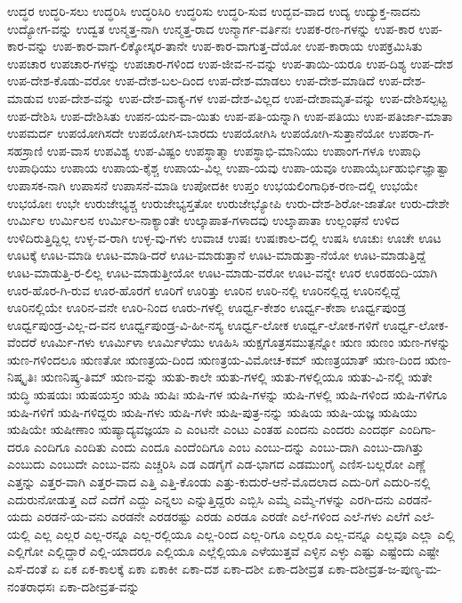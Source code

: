 {ಉದ್ಧರ
ಉದ್ಧರಿ-ಸಲು
ಉದ್ಧರಿಸಿ
ಉದ್ಧರಿಸಿರಿ
ಉದ್ಧರಿಸು
ಉದ್ಧರಿ-ಸುವ
ಉದ್ಭವ-ವಾದ
ಉದ್ಯ
ಉದ್ಯುಕ್ತ-ನಾದನು
ಉದ್ಯೋಗ-ವನ್ನು
ಉದ್ವತ
ಉನ್ಮತ್ತ-ನಾಗಿ
ಉನ್ಮತ್ತ-ರಾದ
ಉನ್ಮಾರ್ಗ-ವರ್ತಿನಃ
ಉಪಕ-ರಣ-ಗಳನ್ನು
ಉಪ-ಕಾರ
ಉಪ-ಕಾರ-ವನ್ನು
ಉಪ-ಕಾರ-ವಾಗ-ಲಿಕ್ಕೋಸ್ಕರ-ತಾನೇ
ಉಪ-ಕಾರ-ವಾಗುತ್ತ-ದೆಯೋ
ಉಪ-ಕಾರಾಯ
ಉಪಕ್ರಮಿಸಿತು
ಉಪಚಾರ
ಉಪಚಾರ-ಗಳನ್ನು
ಉಪಚಾರ-ಗಳಿಂದ
ಉಪ-ಜೀವ-ನ-ವನ್ನು
ಉಪ-ತಾಯಿ-ಯರೂ
ಉಪ-ದಿಶ್ಯ
ಉಪ-ದೇಶ
ಉಪ-ದೇಶ-ಕೊಡು-ವರೋ
ಉಪ-ದೇಶ-ಬಲ-ದಿಂದ
ಉಪ-ದೇಶ-ಮಾಡಲು
ಉಪ-ದೇಶ-ಮಾಡಿದೆ
ಉಪ-ದೇಶ-ಮಾಡುವ
ಉಪ-ದೇಶ-ವನ್ನು
ಉಪ-ದೇಶ-ವಾಕ್ಯ-ಗಳ
ಉಪ-ದೇಶ-ವಿಲ್ಲದ
ಉಪ-ದೇಶಾಮೃತ-ವನ್ನು
ಉಪ-ದೇಶಿಸಲ್ಪಟ್ಟ
ಉಪ-ದೇಶಿಸಿ
ಉಪ-ದೇಶಿಸಿತು
ಉಪನ-ಯನ-ವಾ-ಯಿತು
ಉಪ-ಪತಿ-ಯನ್ನಾಗಿ
ಉಪ-ಪತಿಯು
ಉಪ-ಪತಿರ್ಜಾ-ಮಾತಾ
ಉಪಮರ್ದ
ಉಪಯೋಗಿಸದೇ
ಉಪಯೋಗಿಸ-ಬಾರದು
ಉಪಯೋಗಿಸಿ
ಉಪಯೋಗಿ-ಸುತ್ತಾನೆಯೋ
ಉಪರಾ-ಗ-ಸಹಸ್ರಾಣಿ
ಉಪ-ವಾಸ
ಉಪವಿಶ್ಯ
ಉಪ-ವಿಷ್ಟಂ
ಉಪಸ್ಥಾತ್ಮಾ
ಉಪಸ್ಥಾಭಿ-ಮಾನಿಯು
ಉಪಾಂಗ-ಗಳೂ
ಉಪಾಧಿ
ಉಪಾಧಿಯು
ಉಪಾಯ
ಉಪಾಯ-ಕೈಶ್ಚ
ಉಪಾಯ-ವಿಲ್ಲ
ಉಪಾ-ಯವು
ಉಪಾ-ಯವೂ
ಉಪಾಯೈರ್ಬಹುರ್ಭಿಜ್ಞಾತ್ವಾ
ಉಪಾಸಕ-ನಾಗಿ
ಉಪಾಸನೆ
ಉಪಾಸನೆ-ಮಾಡಿ
ಉಪೋದಕೀ
ಉಪ್ತಂ
ಉಭಯಲಿಂಗಾಧಿಕ-ರಣ-ದಲ್ಲಿ
ಉಭಯೇ
ಉಭಯೋಃ
ಉಭೇ
ಉರುಜೇಭ್ಯಶ್ಚ
ಉರುಜೇಭ್ಯಸ್ತತೋ
ಉರುಜೇಭ್ಯೋಪಿ
ಉರು-ದೇಶ-ಶಿರೋ-ಜಾತೋ
ಉರು-ದೇಶೇ
ಉರ್ಮಿಲ
ಉರ್ಮಿಲನ
ಉರ್ಮಿಲ-ನಾಕ್ಯಾಂತೇ
ಉಲ್ಕಾಪಾತ-ಗಳಾದವು
ಉಲ್ಕಾಪಾತಾ
ಉಲ್ಲಂಘನೆ
ಉಳಿದ
ಉಳಿದಿರುತ್ತಿದ್ದಿಲ್ಲ
ಉಳ್ಳ-ವ-ರಾಗಿ
ಉಳ್ಳ-ವು-ಗಳು
ಉವಾಚ
ಉಷಃ
ಉಷಃಕಾಲ-ದಲ್ಲಿ
ಉಷಸಿ
ಊಚುಃ
ಊಚೇ
ಊಟ
ಊಟಕ್ಕೆ
ಊಟ-ಮಾಡಿ
ಊಟ-ಮಾಡಿ-ದರೆ
ಊಟ-ಮಾಡುತ್ತಾನೆ
ಊಟ-ಮಾಡುತ್ತಾ-ನೆಯೋ
ಊಟ-ಮಾಡುತ್ತಿದ್ದೆ
ಊಟ-ಮಾಡುತ್ತಿ-ರ-ಲಿಲ್ಲ
ಊಟ-ಮಾಡುತ್ತೀಯೋ
ಊಟ-ಮಾಡು-ವರೋ
ಊಟ-ವನ್ನೇ
ಊರ
ಊರಹಂದಿ-ಯಾಗಿ
ಊರ-ಹೊರ-ಗಿ-ರುವ
ಊರ-ಹೊರಗೆ
ಊರಿಗೆ
ಊರಿತ್ತು
ಊರಿನ
ಊರಿ-ನಲ್ಲಿ
ಊರಿನಲ್ಲಿದ್ದ
ಊರಿನಲ್ಲಿದ್ದೆ
ಊರಿನಲ್ಲಿಯೇ
ಊರಿನ-ವನೇ
ಊರಿ-ನಿಂದ
ಊರು-ಗಳಲ್ಲಿ
ಊರ್ಧ್ವ-ಕೇಶಂ
ಊರ್ಧ್ವ-ಕೇಶಾ
ಊರ್ಧ್ವಪುಂಡ್ರ
ಊರ್ಧ್ವಪುಂಡ್ರ-ವಿಲ್ಲ-ದ-ವನ
ಊರ್ಧ್ವಪುಂಡ್ರ-ವಿ-ಹೀ-ನಸ್ಯ
ಊರ್ಧ್ವ-ಲೋಕ
ಊರ್ಧ್ವ-ಲೋಕ-ಗಳಿಗೆ
ಊರ್ಧ್ವ-ಲೋಕ-ವೆಂದರೆ
ಊರ್ಮಿ-ಗಳು
ಊರ್ಮಿಳಾ
ಊರ್ಮಿಳೆಯು
ಊಹಿಸಿ
ಋಕ್ಷಗೊತ್ರಸಮುತ್ಪನ್ನೋ
ಋಣ
ಋಣಂ
ಋಣ-ಗಳನ್ನು
ಋಣ-ಗಳಿಂದಲೂ
ಋಣತೋ
ಋಣತ್ರಯ-ದಿಂದ
ಋಣತ್ರಯ-ವಿಮೋಚ-ಕಮ್
ಋಣತ್ರಯಾತ್
ಋಣ-ದಿಂದ
ಋಣ-ನಿಷ್ಕೃತಿಃ
ಋಣನಿಷ್ಕ್ರ-ತಿಮ್
ಋಣ-ವನ್ನು
ಋತು-ಕಾಲೇ
ಋತು-ಗಳಲ್ಲಿ
ಋತು-ಗಳಲ್ಲಿಯೂ
ಋತು-ವಿ-ನಲ್ಲಿ
ಋತೇ
ಋದ್ಧಿ
ಋಷಯಃ
ಋಷಯಸ್ತಂ
ಋಷಿ
ಋಷಿಃ
ಋಷಿ-ಗಳ
ಋಷಿ-ಗಳನ್ನು
ಋಷಿ-ಗಳಲ್ಲಿ
ಋಷಿ-ಗಳಿಂದ
ಋಷಿ-ಗಳಿಗೂ
ಋಷಿ-ಗಳಿಗೆ
ಋಷಿ-ಗಳಿದ್ದರು
ಋಷಿ-ಗಳು
ಋಷಿ-ಗಳೇ
ಋಷಿ-ಪುತ್ರ-ನನ್ನು
ಋಷಿಯ
ಋಷಿ-ಯಜ್ಞ
ಋಷಿಯು
ಋಷಿಯೇ
ಋಷೀಣಾಂ
ಋಷ್ಯಾದ್ಯವಜ್ಞಯಾ
ಎ
ಎಂಟನೇ
ಎಂಟು
ಎಂತಹ
ಎಂದನು
ಎಂದರು
ಎಂದರ್ಥ
ಎಂದಿಗಾ-ದರೂ
ಎಂದಿಗೂ
ಎಂದಿತು
ಎಂದು
ಎಂದೂ
ಎಂದೆಂದಿಗೂ
ಎಂಬ
ಎಂಬು-ದನ್ನು
ಎಂಬು-ದಾಗಿ
ಎಂಬು-ದಾಗಿತ್ತು
ಎಂಬುದು
ಎಂಬುದೇ
ಎಂಬು-ವನು
ಎಚ್ಚರಿಸಿ
ಎಡ
ಎಡಗೈಗೆ
ಎಡ-ಭಾಗದ
ಎಡಮುಂಗೈ
ಎಣಿಸ-ಬಲ್ಲರೋ
ಎಣ್ಣೆ
ಎತ್ತನ್ನು
ಎತ್ತರ-ವಾಗಿ
ಎತ್ತರ-ವಾದ
ಎತ್ತಿ
ಎತ್ತಿ-ಕೊಂಡು
ಎತ್ತು-ಕುದುರೆ-ಆನೆ-ಮೊದಲಾದ
ಎದು-ರಿಗೆ
ಎದುರಿ-ನಲ್ಲಿ
ಎದುರುನೋಡುತ್ತ
ಎದೆ
ಎದೆಗೆ
ಎದ್ದು
ಎನ್ನಲು
ಎನ್ನುತ್ತಿದ್ದರು
ಎಬ್ಬಿಸಿ
ಎಮ್ಮೆ
ಎಮ್ಮೆ-ಗಳನ್ನು
ಎರಗಿ-ದನು
ಎರಡನೆ-ಯದು
ಎರಡನೆ-ಯ-ವನು
ಎರಡನೇ
ಎರಡರಷ್ಟು
ಎರಡು
ಎರಡೂ
ಎರಡೇ
ಎಲೆ-ಗಳಿಂದ
ಎಲೆ-ಗಳು
ಎಲೆಗೆ
ಎಲೆ-ಯಲ್ಲಿ
ಎಲ್ಲ
ಎಲ್ಲರ
ಎಲ್ಲ-ರನ್ನೂ
ಎಲ್ಲ-ರಲ್ಲಿಯೂ
ಎಲ್ಲ-ರಿಂದ
ಎಲ್ಲ-ರಿಗೂ
ಎಲ್ಲರೂ
ಎಲ್ಲ-ವನ್ನೂ
ಎಲ್ಲವೂ
ಎಲ್ಲಾ
ಎಲ್ಲಿ
ಎಲ್ಲಿಗೋ
ಎಲ್ಲಿದ್ದಾರೆ
ಎಲ್ಲಿ-ಯಾದರೂ
ಎಲ್ಲಿಯೂ
ಎಲ್ಲೆಲ್ಲಿಯೂ
ಎಳೆಯುತ್ತವೆ
ಎಳ್ಳಿನ
ಎಳ್ಳು
ಎಷ್ಟು
ಎಷ್ಟೆಂದು
ಎಷ್ಟೇ
ಎಸೆ-ದಂತೆ
ಏ
ಏಕ
ಏಕ-ಕಾಲಕ್ಕೆ
ಏಕಾ
ಏಕಾಕೀ
ಏಕಾ-ದಶ
ಏಕಾ-ದಶೀ
ಏಕಾ-ದಶೀವ್ರತ
ಏಕಾ-ದಶೀವ್ರತ-ಜ-ಪುಣ್ಯ-ಮ-ನಂತರಾಧಸಃ
ಏಕಾ-ದಶೀವ್ರತ-ವನ್ನು
}
